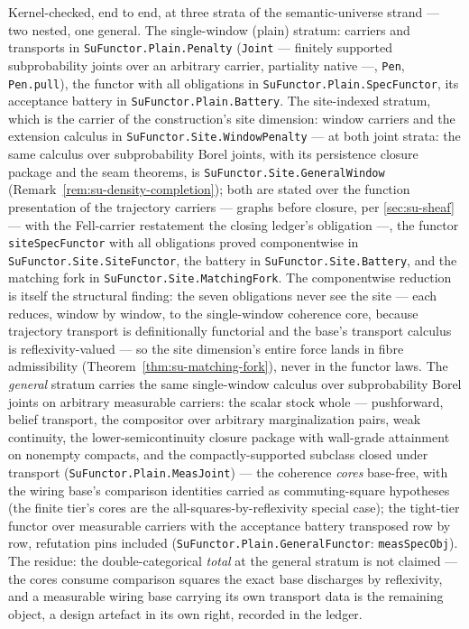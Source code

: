 \begin{remark}
\label{rem:su-house-functor-mechanized}
Kernel-checked, end to end, at three strata of the
semantic-universe strand --- two nested, one general. The
single-window (plain) stratum:
carriers and transports in \texttt{SuFunctor.Plain.Penalty}
(\texttt{Joint} --- finitely supported subprobability joints over an
arbitrary carrier, partiality native ---, \texttt{Pen},
\texttt{Pen.pull}), the functor with all obligations in
\texttt{SuFunctor.Plain.SpecFunctor}, its acceptance battery in
\texttt{SuFunctor.Plain.Battery}. The site-indexed stratum, which is
the carrier of the construction's site dimension: window carriers and the extension
calculus in \texttt{SuFunctor.Site.WindowPenalty} --- at both joint
strata: the same calculus over subprobability Borel joints, with its
persistence closure package and the seam theorems, is
\texttt{SuFunctor.Site.GeneralWindow}
(Remark~\ref{rem:su-density-completion}); both are stated over the
function presentation of the trajectory carriers --- graphs before
closure, per \autoref{sec:su-sheaf} --- with the Fell-carrier
restatement the closing ledger's obligation ---, the functor
\texttt{siteSpecFunctor} with all obligations proved componentwise
in \texttt{SuFunctor.Site.SiteFunctor}, the battery in
\texttt{SuFunctor.Site.Battery}, and the matching fork in
\texttt{SuFunctor.Site.MatchingFork}. The componentwise reduction is
itself the structural finding: the seven obligations never see the
site --- each reduces, window by window, to the single-window
coherence core, because trajectory transport is definitionally
functorial and the base's transport calculus is reflexivity-valued
--- so the site dimension's entire force lands in fibre
admissibility (Theorem~\ref{thm:su-matching-fork}), never in the
functor laws. The \emph{general} stratum carries the same
single-window calculus over subprobability Borel joints on
arbitrary measurable carriers: the scalar stock whole ---
pushforward, belief transport, the compositor over arbitrary
marginalization pairs, weak continuity, the lower-semicontinuity
closure package with wall-grade attainment on nonempty compacts,
and the compactly-supported subclass closed under transport
(\texttt{SuFunctor.Plain.MeasJoint}) --- the coherence \emph{cores}
base-free, with the wiring base's comparison identities carried as
commuting-square hypotheses (the finite tier's cores are the
all-squares-by-reflexivity special case); the tight-tier functor
over measurable carriers with the acceptance battery transposed row
by row, refutation pins included
(\texttt{SuFunctor.Plain.GeneralFunctor}: \texttt{measSpecObj}).
The residue: the
double-categorical \emph{total} at the general stratum is not
claimed --- the cores consume comparison squares the exact base
discharges by reflexivity, and a measurable wiring base carrying
its own transport data is the remaining object, a design artefact
in its own right, recorded in the ledger.
\end{remark}

